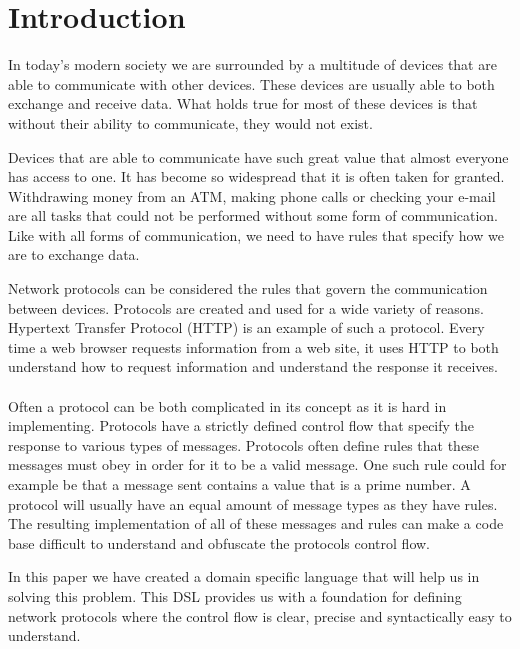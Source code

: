 \section{Introduction}
In today's modern society we are surrounded by a multitude of devices that are able to communicate with other devices. These devices are usually able to both exchange and receive data. What holds true for most of these devices is that without their ability to communicate, they would not exist.

Devices that are able to communicate have such great value that almost everyone has access to one. It has become so widespread that it is often taken for granted. Withdrawing money from an ATM, making phone calls or checking your e-mail are all tasks that could not be performed without some form of communication. Like with all forms of communication, we need to have rules that specify how we are to exchange data. 

Network protocols can be considered the rules that govern the communication between devices. Protocols are created and used for a wide variety of reasons. Hypertext Transfer Protocol (HTTP) \cite{fielding1999hypertext} is an example of such a protocol. Every time a web browser requests information from a web site, it uses HTTP to both understand how to request information and understand the response it receives.   
\\\\
Often a protocol can be both complicated in its concept as it is hard in implementing. Protocols have a strictly defined control flow that specify the response to various types of messages. Protocols often define rules that these messages must obey in order for it to be a valid message. One such rule could for example be that a message sent contains a value that is a prime number. A protocol will usually have an equal amount of message types as they have rules. The resulting implementation of all of these messages and rules can make a code base difficult to understand and obfuscate the protocols control flow.

In this paper we have created a domain specific language that will help us in solving this problem. This DSL provides us with a foundation for defining network protocols where the control flow is clear, precise and syntactically easy to understand. 

